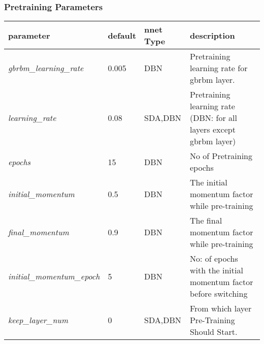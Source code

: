 \subsubsection{Pretraining Parameters}
\label{subsec:pretrainparam}
\begin{table}[h]
\centering
\begin{tabular}{|l|l|l|p{6cm}|}
\hline
 \textbf{parameter}	 & \textbf{default}	 & \textbf{nnet Type}	 & \textbf{description}\\
\hline
 \emph{gbrbm\_learning\_rate}	 &     0.005	 &    DBN	 & Pretraining learning rate for gbrbm layer.\\
 \emph{learning\_rate}	 &      0.08	 &  SDA,DBN	 & Pretraining learning rate (DBN: for all layers except gbrbm layer)\\
 \emph{epochs}	 &       15	 &    DBN	 & No of Pretraining epochs\\
 \emph{initial\_momentum}	 &      0.5	 &    DBN	 & The initial momentum factor while pre-training\\
 \emph{final\_momentum}	 &      0.9	 &    DBN	 & The final momentum factor while pre-training\\
 \emph{initial\_momentum\_epoch}	 &       5	 &    DBN	 & No: of epochs with the initial momentum factor before switching\\
 \emph{keep\_layer\_num}	 &       0	 &  SDA,DBN	 & From which layer Pre-Training Should Start.\\
 \hline
\end{tabular}
\end{table}

